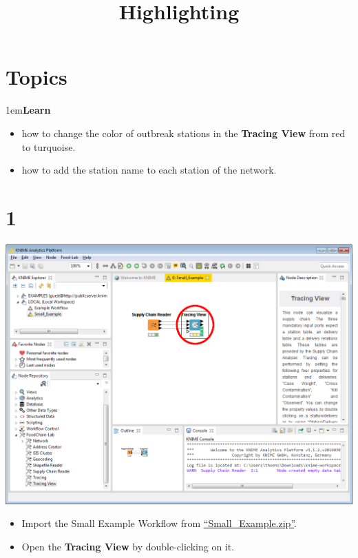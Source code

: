 \documentclass[10pt]{beamer}
\title{Highlighting}
\date{}
\begin{document}
\maketitle

\section{Topics}
\begin{frame}
\leftskip1em\textbf{Learn}
	\begin{itemize}
		\item how to change the color of outbreak stations in the \textbf{Tracing View} from red to turquoise.
		\item how to add the station name to each station of the network.
	\end{itemize}
\end{frame}

\section{1}
\begin{frame}
	\begin{center}
  		\includegraphics[height=0.6\textheight]{1.png}
	\end{center}
	\begin{itemize}
		\item Import the Small Example Workflow from \textcolor{blue}{\underline{\href{https://github.com/SiLeBAT/BfROpenLabResources/raw/master/GitHubPages/workflows/Small\_Example.zip}{``Small\_Example.zip''}}}.
		\item Open the \textbf{Tracing View} by double-clicking on it.
	\end{itemize}
\end{frame}
\end{document}
